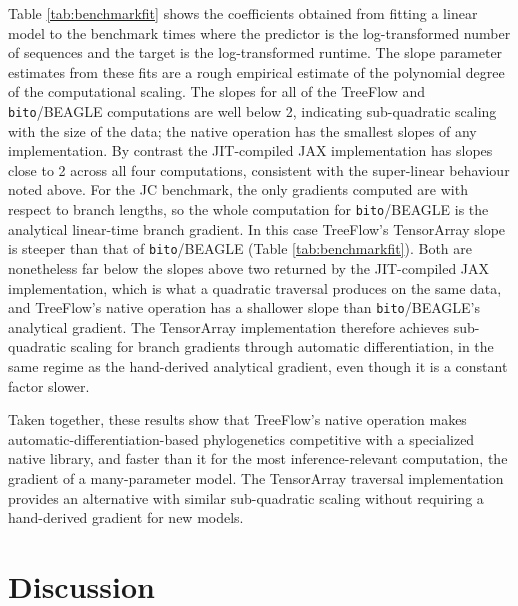 Table \ref{tab:benchmarkfit} shows the coefficients obtained from fitting a linear model to the benchmark times where the predictor is the log-transformed number of sequences and the target is the log-transformed runtime. The slope parameter estimates from these fits are a rough empirical estimate of the polynomial degree of the computational scaling. The slopes for all of the TreeFlow and \texttt{bito}/BEAGLE computations are well below 2, indicating sub-quadratic scaling with the size of the data; the native operation has the smallest slopes of any implementation. By contrast the JIT-compiled JAX implementation has slopes close to 2 across all four computations, consistent with the super-linear behaviour noted above. For the JC benchmark, the only gradients computed are with respect to branch lengths, so the whole computation for \texttt{bito}/BEAGLE is the analytical linear-time branch gradient. In this case TreeFlow's TensorArray slope is steeper than that of \texttt{bito}/BEAGLE (Table \ref{tab:benchmarkfit}). Both are nonetheless far below the slopes above two returned by the JIT-compiled JAX implementation, which is what a quadratic traversal produces on the same data, and TreeFlow's native operation has a shallower slope than \texttt{bito}/BEAGLE's analytical gradient. The TensorArray implementation therefore achieves sub-quadratic scaling for branch gradients through automatic differentiation, in the same regime as the hand-derived analytical gradient, even though it is a constant factor slower.

Taken together, these results show that TreeFlow's native operation makes automatic-differentiation-based phylogenetics competitive with a specialized native library, and faster than it for the most inference-relevant computation, the gradient of a many-parameter model. The TensorArray traversal implementation provides an alternative with similar sub-quadratic scaling without requiring a hand-derived gradient for new models.

\section{Discussion}

